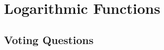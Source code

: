 \section{Logarithmic Functions} \label{S:0.4.Logarithms}


\newpage

\newpage

\newpage

\newpage

\newpage
\subsection*{Voting Questions}

\newpage

